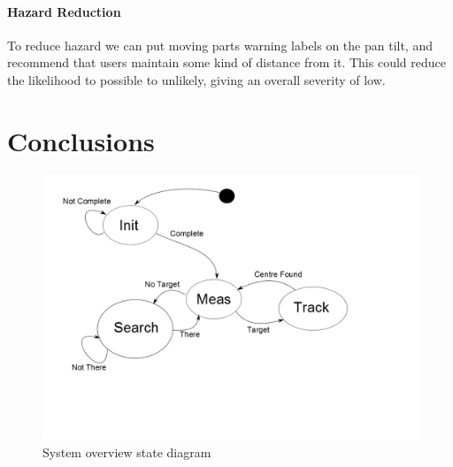 \documentclass[]{report}
\begin{document}
\subsubsection{Hazard Reduction}
To reduce hazard we can put moving parts warning labels on the pan tilt, and recommend that users maintain some kind of distance from it. This could reduce the likelihood to possible to unlikely, giving an overall severity of low.

\chapter{Conclusions}


\begin{figure}
\centering
\includegraphics[width=0.7\linewidth]{"../Diagrams/Operation State Transition Diagram"}
\caption[State Diagram]{System overview state diagram}
\label{fig:OperationStateTransitionDiagram}
\end{figure}
\end{document}
